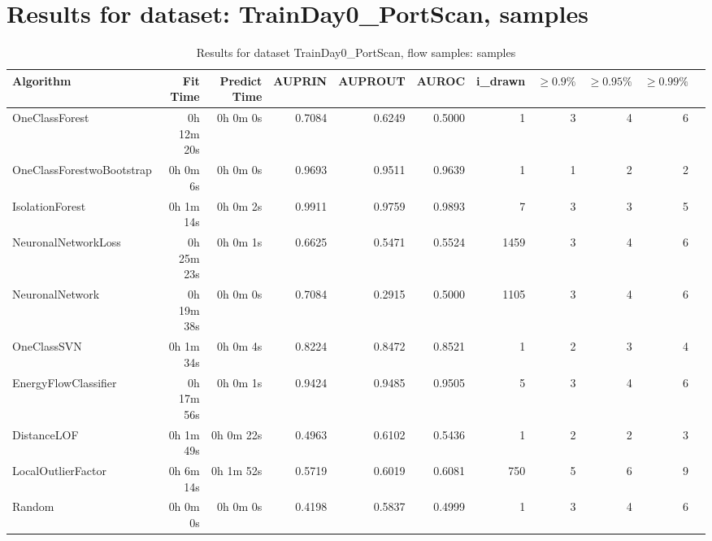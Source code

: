 \documentclass{article}
\begin{document}
\section*{Results for dataset: TrainDay0_PortScan, samples}
\begin{table}[h!]
\centering
\caption{Results for dataset TrainDay0_PortScan, flow samples: samples}
\begin{tabular}{lrrrrrrrrrr}
\toprule
Algorithm & Fit Time & Predict Time & AUPRIN & AUPROUT & AUROC & i\_drawn & $\geq 0.9\%$ & $\geq 0.95\%$ & $\geq 0.99\%$ \\
\midrule
OneClassForest & 0h 12m 20s & 0h 0m 0s & 0.7084 & 0.6249 & 0.5000 & 1 & 3 & 4 & 6 \\
OneClassForestwoBootstrap & 0h 0m 6s & 0h 0m 0s & 0.9693 & 0.9511 & 0.9639 & 1 & 1 & 2 & 2 \\
IsolationForest & 0h 1m 14s & 0h 0m 2s & 0.9911 & 0.9759 & 0.9893 & 7 & 3 & 3 & 5 \\
NeuronalNetworkLoss & 0h 25m 23s & 0h 0m 1s & 0.6625 & 0.5471 & 0.5524 & 1459 & 3 & 4 & 6 \\
NeuronalNetwork & 0h 19m 38s & 0h 0m 0s & 0.7084 & 0.2915 & 0.5000 & 1105 & 3 & 4 & 6 \\
OneClassSVN & 0h 1m 34s & 0h 0m 4s & 0.8224 & 0.8472 & 0.8521 & 1 & 2 & 3 & 4 \\
EnergyFlowClassifier & 0h 17m 56s & 0h 0m 1s & 0.9424 & 0.9485 & 0.9505 & 5 & 3 & 4 & 6 \\
DistanceLOF & 0h 1m 49s & 0h 0m 22s & 0.4963 & 0.6102 & 0.5436 & 1 & 2 & 2 & 3 \\
LocalOutlierFactor & 0h 6m 14s & 0h 1m 52s & 0.5719 & 0.6019 & 0.6081 & 750 & 5 & 6 & 9 \\
Random & 0h 0m 0s & 0h 0m 0s & 0.4198 & 0.5837 & 0.4999 & 1 & 3 & 4 & 6 \\
\bottomrule
\end{tabular}
\end{table}
\end{document}
